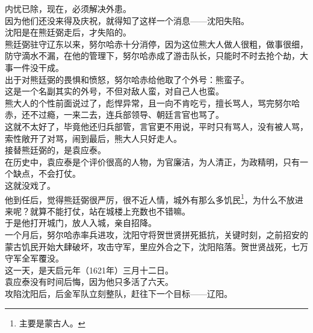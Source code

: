 \begin{multicols}{\theparacolNo}
内忧已除，现在，必须解决外患。\\

因为他们还没来得及庆祝，就得知了这样一个消息——沈阳失陷。\\

沈阳是在熊廷弼走后，才失陷的。\\

熊廷弼驻守辽东以来，努尔哈赤十分消停，因为这位熊大人做人很粗，做事很细，防守滴水不漏，在他的管理下，努尔哈赤成了游击队长，只能时不时去抢个劫，大事一件没干成。\\

出于对熊廷弼的畏惧和愤怒，努尔哈赤给他取了个外号：熊蛮子。\\

这是一个名副其实的外号，不但对敌人蛮，对自己人也蛮。\\

熊大人的个性前面说过了，彪悍异常，且一向不肯吃亏，擅长骂人，骂完努尔哈赤，还不过瘾，一来二去，连兵部领导、朝廷言官也骂了。\\

这就不太好了，毕竟他还归兵部管，言官更不用说，平时只有骂人，没有被人骂，索性敞开了对骂，闹到最后，熊大人只好走人。\\

接替熊廷弼的，是袁应泰。\\

在历史中，袁应泰是个评价很高的人物，为官廉洁，为人清正，为政精明，只有一个缺点，不会打仗。\\

这就没戏了。\\

他到任后，觉得熊廷弼很严厉，很不近人情，城外有那么多饥民\footnote{主要是蒙古人。}，为什么不放进来呢？就算不能打仗，站在城楼上充数也不错嘛。\\

于是他打开城门，放人入城，亲自招降。\\

一个月后，努尔哈赤率兵进攻，沈阳守将贺世贤拼死抵抗，关键时刻，之前招安的蒙古饥民开始大肆破坏，攻击守军，里应外合之下，沈阳陷落。贺世贤战死，七万守军全军覆没。\\

这一天，是天启元年（1621年）三月十二日。\\

袁应泰没有时间后悔，因为他只多活了六天。\\

攻陷沈阳后，后金军队立刻整队，赶往下一个目标——辽阳。\\


\end{multicols}
